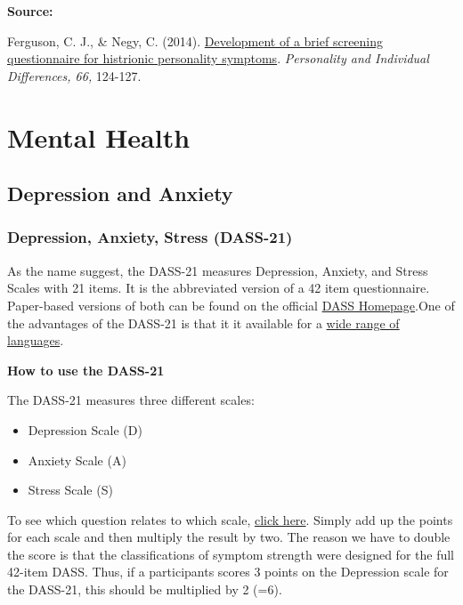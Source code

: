 \documentclass[
]{book}
\providecommand{\tightlist}{%
  \setlength{\itemsep}{0pt}\setlength{\parskip}{0pt}}
\begin{document}
\textbf{Source:}

Ferguson, C. J., \& Negy, C. (2014). \href{https://www.christopherjferguson.com/Histrionic.pdf}{Development of a brief screening questionnaire for histrionic personality symptoms}. \emph{Personality and Individual Differences, 66,} 124-127.

\hypertarget{mental-health}{%
\chapter{Mental Health}\label{mental-health}}

\hypertarget{depression-and-anxiety}{%
\section{Depression and Anxiety}\label{depression-and-anxiety}}

\hypertarget{depression-anxiety-stress-dass-21}{%
\subsection{Depression, Anxiety, Stress (DASS-21)}\label{depression-anxiety-stress-dass-21}}

As the name suggest, the DASS-21 measures Depression, Anxiety, and Stress Scales with 21 items. It is the abbreviated version of a 42 item questionnaire. Paper-based versions of both can be found on the official \href{http://www2.psy.unsw.edu.au/groups/dass/}{DASS Homepage}.One of the advantages of the DASS-21 is that it it available for a \href{http://www2.psy.unsw.edu.au/groups/dass/translations.htm}{wide range of languages}.

\textbf{How to use the DASS-21}

The DASS-21 measures three different scales:

\begin{itemize}
\tightlist
\item
  Depression Scale (D)
\item
  Anxiety Scale (A)
\item
  Stress Scale (S)
\end{itemize}

To see which question relates to which scale, \href{link}{click here}. Simply add up the points for each scale and then multiply the result by two. The reason we have to double the score is that the classifications of symptom strength were designed for the full 42-item DASS. Thus, if a participants scores 3 points on the Depression scale for the DASS-21, this should be multiplied by 2 (=6).
\end{document}
